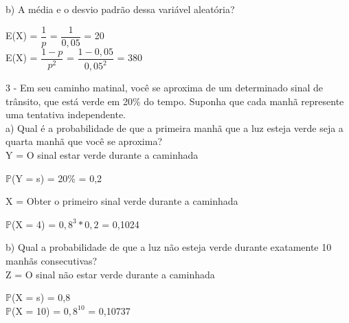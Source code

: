 \documentclass[12pt,a4paper]{article}
\begin{document}
		\vspace{1cm}
	b) A média e o desvio padrão dessa variável aleatória?
	\vspace{0.5cm`}
	\begin{center}	
		E(X) = $\dfrac{1}{p}$ = $\dfrac{1}{0,05}$ = 20
		\vspace{1cm}\\
		E(X) = $\dfrac{1 - p}{p^{2}}$ = $\dfrac{1 - 0,05}{0,05^2}$ = 380
	\end{center}
	\vspace{1cm}
	3 - Em seu caminho matinal, você se aproxima de um determinado sinal de trânsito, que está verde em 20\% do tempo. Suponha que cada manhã represente uma tentativa independente.\\
	a) Qual é a probabilidade de que a primeira manhã que a luz esteja verde seja a quarta manhã que você se aproxima?
	\vspace{0.5cm}\\
	Y =  O sinal estar verde durante a caminhada
	\begin{center}
		\vspace{0.5cm}
		$\mathbb{P}$(Y = s) = 20\% = 0,2
		\vspace{1cm}\\
	\end{center}
	X = Obter o primeiro sinal verde durante a caminhada
	\begin{center}
		\vspace{0.5cm}
		$\mathbb{P}$(X = 4) = $0,8^{3} * 0,2$ = 0,1024
	\end{center}
	\vspace{1cm}
	b) Qual a probabilidade de que a luz não esteja verde durante exatamente 10 manhãs consecutivas?
	\vspace{0.5cm}\\
	Z =  O sinal não estar verde durante a caminhada
	\begin{center}
		$\mathbb{P}$(X = s) = 0,8
		\vspace{0.5cm}\\
		$\mathbb{P}$(X = 10) = $0,8^{10}$ = 0,10737
	\end{center}
\end{document}

